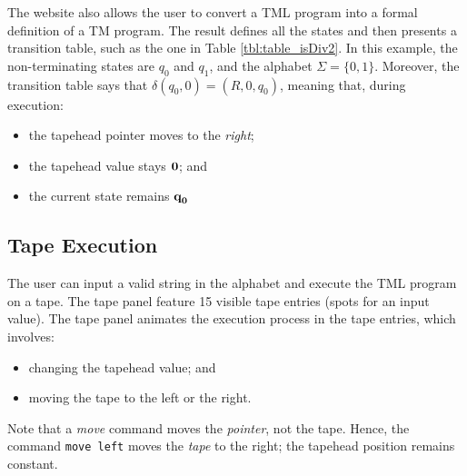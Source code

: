 The website also allows the user to convert a TML program into a formal definition of a TM program. The result defines all the states and then presents a transition table, such as the one in Table \ref{tbl:table_isDiv2}. In this example, the non-terminating states are $q_0$ and $q_1$, and the alphabet $\Sigma = \{0, 1\}$. Moreover, the transition table says that $\delta(q_0, 0) = (R, 0, q_0)$, meaning that, during execution:
\begin{itemize}
    \item the tapehead pointer moves to the \emph{right};
    \item the tapehead value stays $\emph{0}$; and 
    \item the current state remains $\emph{q}_\emph{0}$
\end{itemize}

\subsection{Tape Execution}
The user can input a valid string in the alphabet and execute the TML program on a tape. The tape panel feature 15 visible tape entries (spots for an input value). The tape panel animates the execution process in the tape entries, which involves:
\begin{itemize}
    \item changing the tapehead value; and
    \item moving the tape to the left or the right.
\end{itemize}
Note that a \textit{move} command moves the \textit{pointer}, not the tape. Hence, the command \texttt{move left} moves the \textit{tape} to the right; the tapehead position remains constant.

